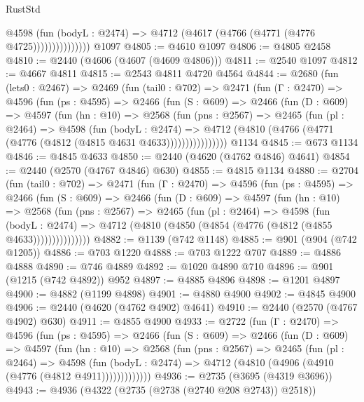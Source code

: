 \begin{lexlean}{RustStd}
\begin{coremodule}
{\begin{coremodule}
{{{{{{{{{{{{                      @4598
                        (fun (bodyL : @2474) =>
                        @4712 (@4617 (@4766 (@4771 (@4776 @4725)))))))))))))))
    @1097
@4805 := @4610 @1097
@4806 := @4805 @2458
@4810 := @2440 (@4606 (@4607 (@4609 @4806)))
@4811 := @2540 @1097
@4812 := @4667 @4811
@4815 := @2543 @4811 @4720 @4564
@4844 := @2680
    (fun (lets0 : @2467) =>
    @2469
      (fun (tail0 : @702) =>
      @2471
        (fun (Γ : @2470) =>
        @4596
          (fun (ps : @4595) =>
          @2466
            (fun (S : @609) =>
            @2466
              (fun (D : @609) =>
              @4597
                (fun (hn : @10) =>
                @2568
                  (fun (pns : @2567) =>
                  @2465
                    (fun (pl : @2464) =>
                    @4598
                      (fun (bodyL : @2474) =>
                      @4712 (@4810 (@4766 (@4771 (@4776 (@4812 (@4815 @4631 @4633))))))))))))))))
    @1134
@4845 := @673 @1134
@4846 := @4845 @4633
@4850 := @2440 (@4620 (@4762 @4846) @4641)
@4854 := @2440 (@2570 (@4767 @4846) @630)
@4855 := @4815 @1134
@4880 := @2704
    (fun (tail0 : @702) =>
    @2471
      (fun (Γ : @2470) =>
      @4596
        (fun (ps : @4595) =>
        @2466
          (fun (S : @609) =>
          @2466
            (fun (D : @609) =>
            @4597
              (fun (hn : @10) =>
              @2568
                (fun (pns : @2567) =>
                @2465
                  (fun (pl : @2464) =>
                  @4598
                    (fun (bodyL : @2474) =>
                    @4712 (@4810 (@4850 (@4854 (@4776 (@4812 (@4855 @4633)))))))))))))))
@4882 := @1139 (@742 @1148)
@4885 := @901 (@904 (@742 @1205))
@4886 := @703 @1220
@4888 := @703 @1222 @707
@4889 := @4886 @4888
@4890 := @746 @4889
@4892 := @1020 @4890 @710
@4896 := @901 (@1215 (@742 @4892)) @952
@4897 := @4885 @4896
@4898 := @1201 @4897
@4900 := @4882 (@1199 @4898)
@4901 := @4880 @4900
@4902 := @4845 @4900
@4906 := @2440 (@4620 (@4762 @4902) @4641)
@4910 := @2440 (@2570 (@4767 @4902) @630)
@4911 := @4855 @4900
@4933 := @2722
    (fun (Γ : @2470) =>
    @4596
      (fun (ps : @4595) =>
      @2466
        (fun (S : @609) =>
        @2466
          (fun (D : @609) =>
          @4597
            (fun (hn : @10) =>
            @2568
              (fun (pns : @2567) =>
              @2465
                (fun (pl : @2464) =>
                @4598
                  (fun (bodyL : @2474) =>
                  @4712 (@4810 (@4906 (@4910 (@4776 (@4812 @4911)))))))))))))
@4936 := @2735 (@3695 (@4319 @3696))
@4943 := @4936 (@4322 (@2735 (@2738 (@2740 @208 @2743)) @2518))
}}}}}}}}}}}}
\end{coremodule}}
\end{coremodule}
\end{lexlean}
